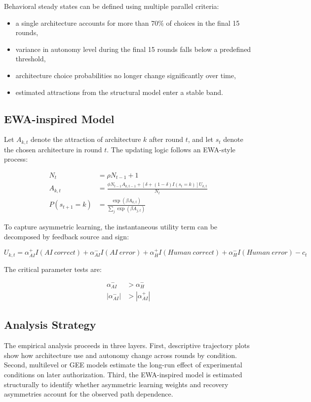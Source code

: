 Behavioral steady states can be defined using multiple parallel criteria:

\begin{itemize}[leftmargin=1.5em]
    \item a single architecture accounts for more than 70\% of choices in the final 15 rounds,
    \item variance in autonomy level during the final 15 rounds falls below a predefined threshold,
    \item architecture choice probabilities no longer change significantly over time,
    \item estimated attractions from the structural model enter a stable band.
\end{itemize}

\subsection{EWA-inspired Model}

Let $A_{k,t}$ denote the attraction of architecture $k$ after round $t$, and let $s_t$ denote the chosen architecture in round $t$. The updating logic follows an EWA-style process:

\begin{align}
N_t &= \rho N_{t-1} + 1 \\
A_{k,t} &= \frac{\phi N_{t-1}A_{k,t-1} + [\delta + (1-\delta)I(s_t = k)]U_{k,t}}{N_t} \\
P(s_{t+1}=k) &= \frac{\exp(\beta A_{k,t})}{\sum_j \exp(\beta A_{j,t})}
\end{align}

To capture asymmetric learning, the instantaneous utility term can be decomposed by feedback source and sign:

\begin{equation}
U_{k,t} =
\alpha_{AI}^{+} I(AI\ correct)
+ \alpha_{AI}^{-} I(AI\ error)
+ \alpha_{H}^{+} I(Human\ correct)
+ \alpha_{H}^{-} I(Human\ error)
- c_t
\end{equation}

The critical parameter tests are:

\begin{align}
\alpha_{AI}^{-} &> \alpha_{H}^{-} \\
|\alpha_{AI}^{-}| &> |\alpha_{AI}^{+}|
\end{align}

\subsection{Analysis Strategy}

The empirical analysis proceeds in three layers. First, descriptive trajectory plots show how architecture use and autonomy change across rounds by condition. Second, multilevel or GEE models estimate the long-run effect of experimental conditions on later authorization. Third, the EWA-inspired model is estimated structurally to identify whether asymmetric learning weights and recovery asymmetries account for the observed path dependence.
